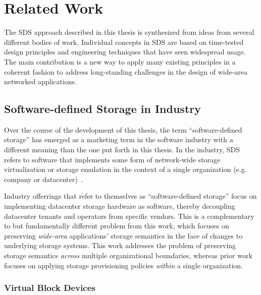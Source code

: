 
\chapter{Related Work}
\label{chap:related-work}

The SDS approach described in this thesis
is synthesized from ideas from several different bodies of work.  Individual
concepts in SDS are based on time-tested design principles and engineering
techniques that have seen widespread usage.  The main contribution is
a new way to apply many existing principles in a coherent fashion
to address long-standing challenges in
the design of wide-area networked applications.

\section{Software-defined Storage in Industry}

Over the course of the development of this thesis, the term ``software-defined
storage'' has emerged as a marketing term in the software
industry with a different meaning than the one put forth in this thesis.
In the industry, SDS refers to software that implements some form of 
network-wide storage virtualization or storage emulation
in the context of a single organization (e.g. company or datacenter)~\cite{techcenter-sds-definition}.

Industry offerrings that refer to themselves as ``software-defined storage''
focus on implementing datacenter storage hardware as software, thereby
decoupling datacenter tenants and operators from specific vendors.  This is a
complementary to but fundamentally different problem from this work, which
focuses on preserving \emph{wide-area} applications' storage semantics in the face of
changes to underlying storage systems.  This work addresses the problem of
preserving storage semantics \emph{across} multiple organizational boundaries, whereas
prior work focuses on applying storage provisioning policies \emph{within} a
single organization.

\subsection{Virtual Block Devices}

